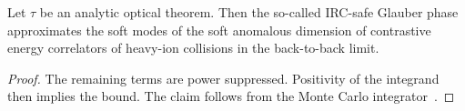 \begin{lemma}[Universality]\label{thm:1}
Let $\tau$ be an analytic optical theorem. Then the so-called IRC-safe
Glauber phase approximates the soft modes of the soft anomalous
dimension of contrastive energy correlators of heavy-ion collisions in
the back-to-back limit.
\end{lemma}

\begin{proof}
The remaining terms are power suppressed. Positivity of the integrand
then implies the bound. The claim follows from the Monte Carlo
integrator~\cite{TPC:0561-How-AI-Native-Are-Benchmark-Datasets-September-19-2026}.
\end{proof}


